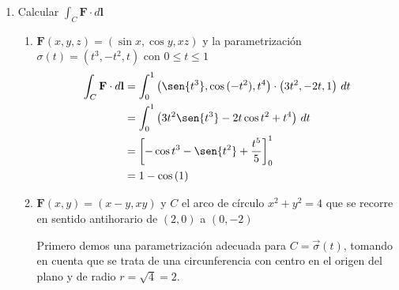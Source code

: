 \documentclass{article}
\begin{document}
\begin{enumerate}
        \item {
           Calcular $\displaystyle\int_{C} \mathbf{F} \cdot d \mathbf{l}$

            \begin{enumerate}
            \item{
                $\mathbf{F} (x,y,z) = (\sin x,\cos y,xz)$ y la parametrización
                $\sigma (t) = (t^3,-t^2,t)$ con $0\leq t\leq 1$
                \color{azul}
                \begin{align*}
                    \int_{C}{\mathbf{F} \cdot d \mathbf{l}}
                    &= \int_{0}^{1}{
                        \left(\sen{t^3}, \cos{(-t^2)}, t^4\right)
                        \cdot\left(3t^2, -2t, 1 \right)
                    \,dt}\\
                    &= \int_{0}^{1}{\left(
                        3t^2\sen{t^3}-2t\cos{t^2}+t^4
                    \right)\,dt}\\
                    &= \left[
                        -\cos{t^3}-\sen{t^2}+\frac{t^5}{5}
                        \right]_{0}^{1}\\
                    &= 1-\cos{(1)}
                \end{align*}
            }
            \item{
                $\mathbf{F} (x,y) = (x-y,xy)$ y $C$ el arco de círculo
                $x^2 + y^2 = 4$ que se recorre en sentido antihorario de $(2,0)$
                a $(0,-2)$

                \color{azul}
                Primero demos una parametrización adecuada para $C=\vec{\sigma}
                (t)$, tomando en cuenta que se trata de una circunferencia con
                centro en el origen del plano y de radio $r=\sqrt{4}=2$.

}
\end{enumerate}}
\end{enumerate}
\end{document}
